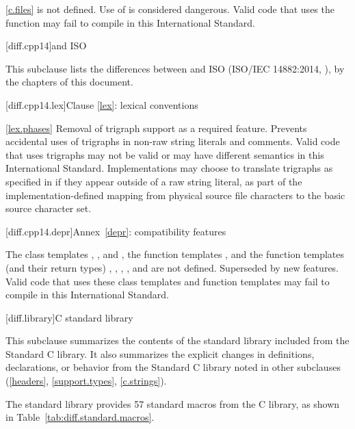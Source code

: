 \ref{c.files}
\change {} is not defined.
\rationale Use of  is considered dangerous.
\effect
Valid \CppXI code that uses the  function may fail to compile
in this International Standard.

[diff.cpp14]{\Cpp and ISO \CppXIV}

\pnum
{}%
This subclause lists the differences between \Cpp and
ISO \CppXIV (ISO/IEC 14882:2014, ),
by the chapters of this document.

[diff.cpp14.lex]{Clause \ref{lex}: lexical conventions}

\ref{lex.phases}
%
\change Removal of trigraph support as a required feature.
\rationale Prevents accidental uses of trigraphs in non-raw string literals and comments.
\effect
Valid \CppXIV code that uses trigraphs may not be valid or may have different
semantics in this International Standard. Implementations may choose to
translate trigraphs as specified in \CppXIV if they appear outside of a raw
string literal, as part of the implementation-defined mapping from physical
source file characters to the basic source character set.

[diff.cpp14.depr]{Annex~\ref{depr}: compatibility features}

\change
The class templates
,
, and
,
the function templates
,
and the function templates (and their return types)
,
,
,
, and
are not defined.
\rationale Superseded by new features.
\effect Valid \CppXIV code that uses these class templates
and function templates may fail to compile in this International Standard.


[diff.library]{C standard library}
%

\pnum
This subclause summarizes the contents of the \Cpp standard library
included from the Standard C library.
It also summarizes the explicit changes in definitions,
declarations, or behavior from the Standard C library
noted in other subclauses (\ref{headers}, \ref{support.types}, \ref{c.strings}).

\pnum
The \Cpp standard library provides 57 standard macros from the C library,
as shown in Table~\ref{tab:diff.standard.macros}.

